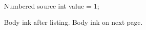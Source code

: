 \documentclass{article}
\begin{document}
\begin{cpp}{Numbered source}
int value = 1;
\end{cpp}
Body ink after listing.
\newpage
Body ink on next page.
\end{document}
